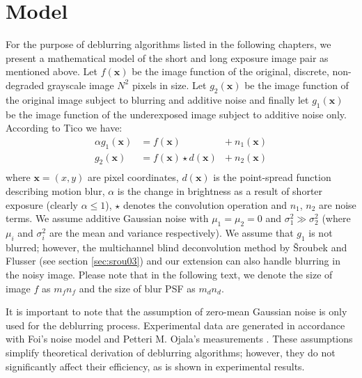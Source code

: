 \documentclass[12pt,notitlepage]{report}
\begin{document}
\clearpage

\section{Model}
\label{sec:model}

For the purpose of deblurring algorithms listed in the following chapters, we present a mathematical model of the short and long exposure image pair as mentioned above. Let $f(\mathbf{x})$ be the image function of the original, discrete, non-degraded grayscale image $N^2$ pixels in size. Let $g_2(\mathbf{x})$ be the image function of the original image subject to blurring and additive noise  and finally let $g_1(\mathbf{x})$ be the image function of the underexposed image subject to additive noise only. According to Tico \cite{tico06} we have:
\begin{equation}
	\label{eq:general_model}
	\begin{aligned}
		\alpha g_1(\mathbf{x}) &= f(\mathbf{x}) &+ \ n_1(\mathbf{x}) \\
		g_2(\mathbf{x}) &= f(\mathbf{x}) \star d(\mathbf{x}) &+ \ n_2(\mathbf{x}) \\
	\end{aligned}
\end{equation}
where $\mathbf{x}=(x,y)$ are pixel coordinates, $d(\mathbf{x})$ is the point-spread function describing motion blur, $\alpha$ is the change in brightness as a result of shorter exposure (clearly $\alpha \leq 1$), $\star$ denotes the convolution operation and $n_1$, $n_2$ are noise terms. We assume additive Gaussian noise with $\mu_1 = \mu_2 = 0$ and $\sigma_1^2 \gg \sigma_2^2$ (where $\mu_i$ and $\sigma_i^2$ are the mean and variance respectively). We assume that $g_1$ is not blurred; however, the multichannel blind deconvolution method by Šroubek and Flusser (see section \ref{sec:srou03}) and our extension can also handle blurring in the noisy image. Please note that in the following text, we denote the size of image $f$ as $m_f n_f$ and the size of blur PSF as $m_d n_d$.

It is important to note that the assumption of zero-mean Gaussian noise is only used for the deblurring process. Experimental data are generated in accordance with Foi's \cite{foi07} noise model and Petteri M. Ojala's measurements \cite{ojal08}. These assumptions simplify theoretical derivation of deblurring algorithms; however, they do not significantly affect their efficiency, as is shown in experimental results.     
\end{document}
